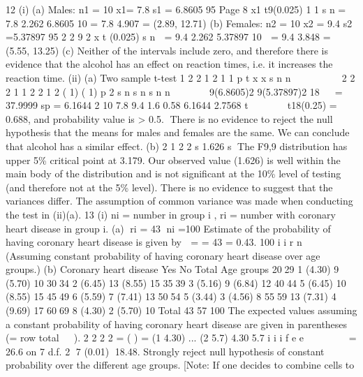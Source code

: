 \documentclass[a4paper,12pt]{article}
\begin{document}

\newpage

12 (i) (a) Males: n1 = 10 x1= 7.8 s1 = 6.8605
95%
Page 8
x1 
 t9(0.025) 1
1
s
n
= 7.8 
 2.262 6.8605
10
= 7.8 
 4.907
= (2.89, 12.71)
(b) Females: n2 = 10 x2 = 9.4 s2 =5.37897
95%
2
2 9
2
x t (0.025) s
n

= 9.4 2.262 5.37897
10
 = 9.4 
 3.848
= (5.55, 13.25)
(c) Neither of the intervals include zero, and therefore there is evidence
that the alcohol has an effect on reaction times, i.e. it increases the
reaction time.
(ii) (a) Two sample t-test
1 2
2
1 2
1 1
p
t x x
s
n n


 
  
 	
2 2
2 1 1 2 2
1 2
( 1) ( 1)
p 2
s n s n s
n n
  

 
9(6.8605)2 9(5.37897)2
18

 = 37.9999
sp = 6.1644
2
10
7.8 9.4 1.6 0.58
6.1644 2.7568
t  
   
t18(0.25) = 0.688, and probability value is > 0.5.
There is no evidence to reject the null hypothesis that the means for
males and females are the same.
We can conclude that alcohol has a similar effect.
(b)
2
1
2
2
s 1.626
s

The F9,9 distribution has upper 5\% critical point at 3.179. Our
observed value (1.626) is well within the main body of the distribution
and is not significant at the 10\% level of testing (and therefore not at
the 5\% level). There is no evidence to suggest that the variances
differ. The assumption of common variance was made when
conducting the test in (ii)(a).
13 (i) ni = number in group i , ri = number with coronary heart disease in group i.
(a) ri = 43 ni =100
Estimate of the probability of having coronary heart disease is given by
 = = 43 = 0.43.
100
i
i
r
n



(Assuming constant probability of having coronary heart disease over
age groups.)
(b)
Coronary heart
disease
Yes No Total
Age groups 2029 1
(4.30)
9
(5.70)
10
3034 2
(6.45)
13
(8.55)
15
3539 3
(5.16)
9
(6.84)
12
4044 5
(6.45)
10
(8.55)
15
4549 6
(5.59)
7
(7.41)
13
5054 5
(3.44)
3
(4.56)
8
5559 13
(7.31)
4
(9.69)
17
6069 8
(4.30)
2
(5.70)
10
Total 43 57 100
The expected values assuming a constant probability of having coronary heart disease
are given in parentheses (= row total  ).
2 2 2
2 = ( ) = (1 4.30) ... (2 5.7)
4.30 5.7
i i
i
f e
e
  
    = 26.6 on 7 d.f.
2
7 (0.01) 18.48.
Strongly reject null hypothesis of constant probability over the
different age groups. [Note: If one decides to combine cells to
\end{document}
